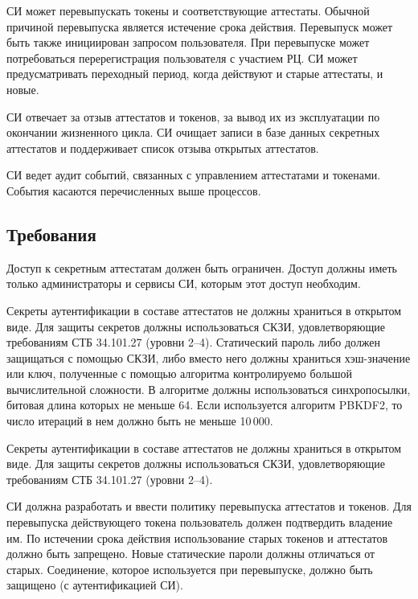 %

СИ может перевыпускать токены и соответствующие аттестаты. Обычной причиной
перевыпуска является истечение срока действия. Перевыпуск может быть также
инициирован запросом пользователя. При перевыпуске может потребоваться
перерегистрация пользователя с участием РЦ. СИ может предусматривать переходный
период, когда действуют и старые аттестаты, и новые.

СИ отвечает за отзыв аттестатов и токенов, за вывод их из эксплуатации по 
окончании жизненного цикла. 
%
СИ очищает записи в базе данных секретных аттестатов и поддерживает список 
отзыва открытых аттестатов.

СИ ведет аудит событий, связанных с управлением аттестатами и токенами. 
События касаются перечисленных выше процессов.

\subsection{Требования}\label{CM.Reqs}

Доступ к секретным аттестатам должен быть ограничен.
Доступ должны иметь только администраторы и сервисы СИ,
которым этот доступ необходим. 

Секреты аутентификации в составе аттестатов не должны храниться в открытом 
виде. 
%
Для защиты секретов должны использоваться СКЗИ, удовлетворяющие 
требованиям СТБ 34.101.27 (уровни 2--4).
%
Статический пароль либо должен защищаться с помощью СКЗИ, 
либо вместо него должны храниться хэш-значение или ключ, 
полученные с помощью алгоритма контролируемо большой вычислительной 
сложности. В алгоритме должны использоваться синхропосылки, 
битовая длина которых не меньше 64. Если используется алгоритм PBKDF2,
то число итераций в нем должно быть не меньше 10\,000.

Секреты аутентификации в составе аттестатов не должны храниться в открытом 
виде. Для защиты секретов должны использоваться СКЗИ, удовлетворяющие 
требованиям СТБ 34.101.27 (уровни 2--4).


СИ должна разработать и ввести политику перевыпуска аттестатов и токенов.
Для перевыпуска действующего токена пользователь должен 
подтвердить владение им. По истечении срока действия
использование старых токенов и аттестатов должно быть запрещено. 
Новые статические пароли должны отличаться от старых. 
Соединение, которое используется при перевыпуске, должно быть защищено 
(с аутентификацией СИ). 


